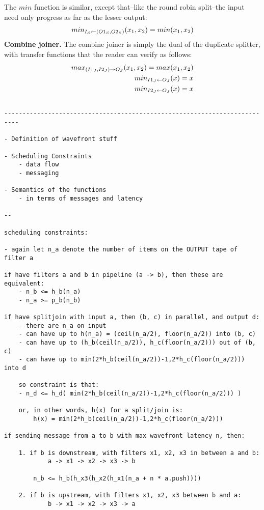 The $min$ function is similar, except that--like the round robin
split--the input need only progress as far as the lesser output:
\begin{eqnarray*}
min_{I_S \leftarrow (O1_S, O2_S)}(x_1, x_2) = min(x_1, x_2)
\end{eqnarray*}
{\bf Combine joiner.} The combine joiner is simply the dual of the
duplicate splitter, with transfer functions that the reader can verify
as follows:
\begin{eqnarray*}
max_{(I1_J, I2_J) \rightarrow O_J}(x_1, x_2) = max(x_1, x_2) \\
min_{I1_J \leftarrow O_J}(x) = x \\
min_{I2_J \leftarrow O_J}(x) = x
\end{eqnarray*}

\begin{verbatim}

--------------------------------------------------------------------------

- Definition of wavefront stuff

- Scheduling Constraints
	- data flow
	- messaging

- Semantics of the functions
	- in terms of messages and latency

--

scheduling constraints:

- again let n_a denote the number of items on the OUTPUT tape of filter a

if have filters a and b in pipeline (a -> b), then these are equivalent:
	- n_b <= h_b(n_a)
	- n_a >= p_b(n_b)

if have splitjoin with input a, then (b, c) in parallel, and output d:
	- there are n_a on input
	- can have up to h(n_a) = (ceil(n_a/2), floor(n_a/2)) into (b, c)
	- can have up to (h_b(ceil(n_a/2)), h_c(floor(n_a/2))) out of (b, c)
	- can have up to min(2*h_b(ceil(n_a/2))-1,2*h_c(floor(n_a/2))) into d

	so constraint is that:
	- n_d <= h_d( min(2*h_b(ceil(n_a/2))-1,2*h_c(floor(n_a/2))) )

	or, in other words, h(x) for a split/join is:
		h(x) = min(2*h_b(ceil(n_a/2))-1,2*h_c(floor(n_a/2)))

if sending message from a to b with max wavefront latency n, then:
	
	1. if b is downstream, with filters x1, x2, x3 in between a and b:
			a -> x1 -> x2 -> x3 -> b

		n_b <= h_b(h_x3(h_x2(h_x1(n_a + n * a.push))))

	2. if b is upstream, with filters x1, x2, x3 between b and a:
			b -> x1 -> x2 -> x3 -> a


\end{verbatim}
